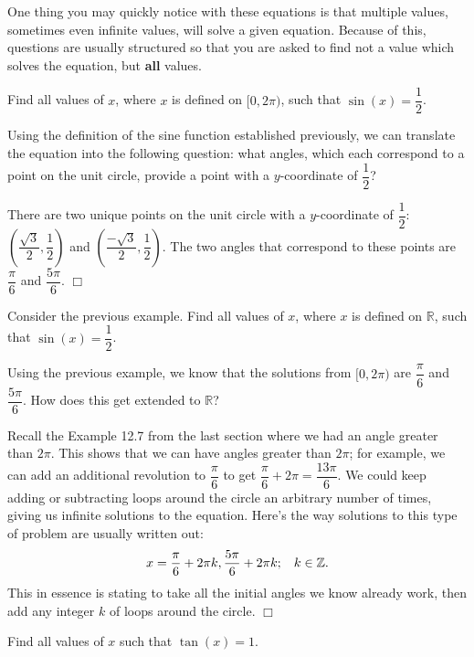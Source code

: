 \documentclass[../book.tex]{subfiles}
\begin{document}
One thing you may quickly notice with these equations is that multiple values, sometimes even infinite values, will solve a given equation. Because of this, questions are usually structured so that you are asked to find not a value which solves the equation, but \textbf{all} values.
\begin{example}
Find all values of $x$, where $x$ is defined on $[0,2\pi)$, such that $\sin(x)=\dfrac{1}{2}$.
\end{example}
\begin{solution}
Using the definition of the sine function established previously, we can translate the equation into the following question: what angles, which each correspond to a point on the unit circle, provide a point with a $y$-coordinate of $\dfrac{1}{2}$?

There are two unique points on the unit circle with a $y$-coordinate of $\dfrac{1}{2}$: $\left(\dfrac{\sqrt{3}}{2},\dfrac{1}{2}\right)$ and $\left(\dfrac{-\sqrt{3}}{2},\dfrac{1}{2}\right)$. The two angles that correspond to these points are $\dfrac{\pi}{6}$ and $\dfrac{5\pi}{6}$. $\Box$
\end{solution}
\begin{example}
Consider the previous example.  Find all values of $x$, where $x$ is defined on $\mathbb{R}$, such that $\sin(x)=\dfrac{1}{2}$.
\end{example}
\begin{solution}
Using the previous example, we know that the solutions from $[0,2\pi)$ are $\dfrac{\pi}{6}$ and $\dfrac{5\pi}{6}$. How does this get extended to $\mathbb{R}$?

Recall the Example 12.7 from the last section where we had an angle greater than $2\pi$. This shows that we can have angles greater than $2\pi$; for example, we can add an additional revolution to $\dfrac{\pi}{6}$ to get $\dfrac{\pi}{6}+2\pi=\dfrac{13\pi}{6}$. We could keep adding or subtracting loops around the circle an arbitrary number of times, giving us infinite solutions to the equation. Here's the way solutions to this type of problem are usually written out: $$x=\dfrac{\pi}{6}+2\pi k,\dfrac{5\pi}{6}+2\pi k; \hspace{3mm} k\in\mathbb{Z}.$$ This in essence is stating to take all the initial angles we know already work, then add any integer $k$ of loops around the circle. $\Box$
\end{solution}
\begin{example}
Find all values of $x$ such that $\tan(x)=1$.
\end{example}
\end{document}
